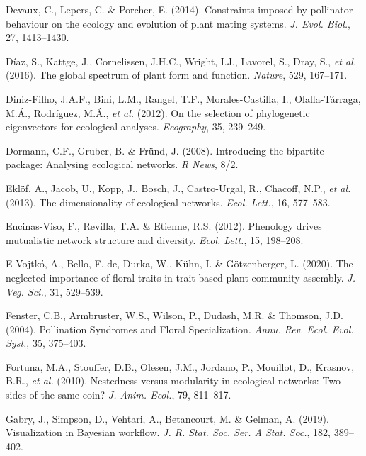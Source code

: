 \documentclass[
  12pt,
  a4paper,
]{article}
\newlength{\cslhangindent}
\newlength{\cslentryspacingunit} %
\newenvironment{CSLReferences}[2] %
 {%
  \setlength{\parindent}{0pt}
  \ifodd #1
  \let\oldpar\par
  \def\par{\hangindent=\cslhangindent\oldpar}
  \fi
  \setlength{\parskip}{#2\cslentryspacingunit}
 }%
 {}
\begin{document}
\begin{CSLReferences}{1}{0}
\leavevmode{}%
Devaux, C., Lepers, C. \& Porcher, E. (2014). Constraints imposed by pollinator behaviour on the ecology and evolution of plant mating systems. \emph{J. Evol. Biol.}, 27, 1413--1430.

\leavevmode{}%
Díaz, S., Kattge, J., Cornelissen, J.H.C., Wright, I.J., Lavorel, S., Dray, S., \emph{et al.} (2016). The global spectrum of plant form and function. \emph{Nature}, 529, 167--171.

\leavevmode{}%
Diniz-Filho, J.A.F., Bini, L.M., Rangel, T.F., Morales-Castilla, I., Olalla-Tárraga, M.Á., Rodríguez, M.Á., \emph{et al.} (2012). On the selection of phylogenetic eigenvectors for ecological analyses. \emph{Ecography}, 35, 239--249.

\leavevmode{}%
Dormann, C.F., Gruber, B. \& Fründ, J. (2008). Introducing the bipartite package: Analysing ecological networks. \emph{R News}, 8/2.

\leavevmode{}%
Eklöf, A., Jacob, U., Kopp, J., Bosch, J., Castro-Urgal, R., Chacoff, N.P., \emph{et al.} (2013). The dimensionality of ecological networks. \emph{Ecol. Lett.}, 16, 577--583.

\leavevmode{}%
Encinas-Viso, F., Revilla, T.A. \& Etienne, R.S. (2012). Phenology drives mutualistic network structure and diversity. \emph{Ecol. Lett.}, 15, 198--208.

\leavevmode{}%
E-Vojtkó, A., Bello, F. de, Durka, W., Kühn, I. \& Götzenberger, L. (2020). The neglected importance of floral traits in trait-based plant community assembly. \emph{J. Veg. Sci.}, 31, 529--539.

\leavevmode{}%
Fenster, C.B., Armbruster, W.S., Wilson, P., Dudash, M.R. \& Thomson, J.D. (2004). Pollination {Syndromes} and {Floral Specialization}. \emph{Annu. Rev. Ecol. Evol. Syst.}, 35, 375--403.

\leavevmode{}%
Fortuna, M.A., Stouffer, D.B., Olesen, J.M., Jordano, P., Mouillot, D., Krasnov, B.R., \emph{et al.} (2010). Nestedness versus modularity in ecological networks: Two sides of the same coin? \emph{J. Anim. Ecol.}, 79, 811--817.

\leavevmode{}%
Gabry, J., Simpson, D., Vehtari, A., Betancourt, M. \& Gelman, A. (2019). Visualization in {Bayesian} workflow. \emph{J. R. Stat. Soc. Ser. A Stat. Soc.}, 182, 389--402.


\end{CSLReferences}
\end{document}
